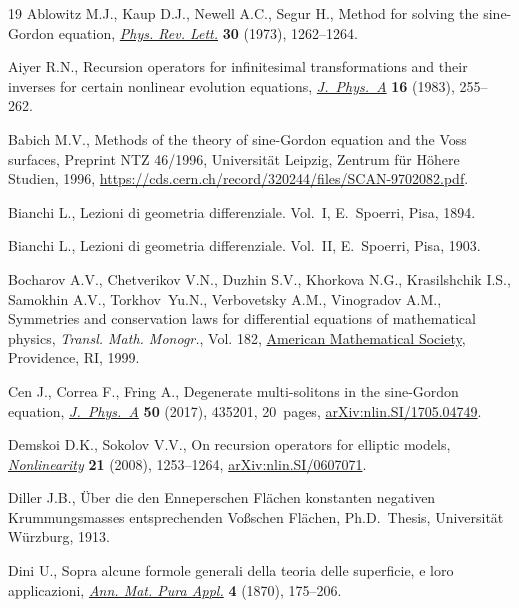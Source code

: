 \documentclass[pdftex]{sigma}
\numberwithin{equation}{section}
\theoremstyle{definition}
\begin{document}
\begin{thebibliography}{19}
\footnotesize\itemsep=0pt
Ablowitz M.J., Kaup D.J., Newell A.C., Segur H., Method for solving the
 sine-{G}ordon equation,
 \href{https://doi.org/10.1103/PhysRevLett.30.1262}{\textit{Phys. Rev. Lett.}}
 \textbf{30} (1973), 1262--1264.

Aiyer R.N., Recursion operators for infinitesimal transformations and their
 inverses for certain nonlinear evolution equations,
 \href{https://doi.org/10.1088/0305-4470/16/2/008}{\textit{J.~Phys.~A}}
 \textbf{16} (1983), 255--262.

Babich M.V., Methods of the theory of sine-{G}ordon equation and the {V}oss
 surfaces, {P}reprint NTZ 46/1996, Universit\"at Leipzig, Zentrum f\"ur
 H\"ohere Studien, 1996,
 \url{https://cds.cern.ch/record/320244/files/SCAN-9702082.pdf}.

Bianchi L., Lezioni di geometria differenziale. {V}ol.~I, E.~Spoerri, Pisa,
 1894.

Bianchi L., Lezioni di geometria differenziale. {V}ol.~II, E.~Spoerri, Pisa,
 1903.

Bocharov A.V., Chetverikov V.N., Duzhin S.V., Khorkova N.G., Krasilshchik I.S.,
 Samokhin A.V., Torkhov~Yu.N., Verbovetsky A.M., Vinogradov A.M., Symmetries
 and conservation laws for differential equations of mathematical physics,
 \textit{Transl. Math. Monogr.}, Vol. 182,
 \href{https://doi.org/10.1090/mmono/182}{American Mathematical Society},
 Providence, RI, 1999.

Cen J., Correa F., Fring A., Degenerate multi-solitons in the sine-{G}ordon
 equation,
 \href{https://doi.org/10.48550/arXiv.1705.04749}{\textit{J.~Phys.~A}}
 \textbf{50} (2017), 435201, 20~pages,
 \href{http://arxiv.org/abs/nlin.SI/1705.04749}{arXiv:nlin.SI/1705.04749}.

Demskoi D.K., Sokolov V.V., On recursion operators for elliptic models,
 \href{https://doi.org/10.48550/arXiv.nlin/0607071}{\textit{Nonlinearity}}
 \textbf{21} (2008), 1253--1264,
 \href{http://arxiv.org/abs/nlin.SI/0607071}{arXiv:nlin.SI/0607071}.

Diller J.B., \"Uber die den {E}nneperschen {F}l\"achen konstanten negativen
 {K}rummungsmasses entsprechenden {V}o{\ss}schen {F}l\"achen, Ph.D.~Thesis,
 {U}niversit\"at W\"urzburg, 1913.

Dini U., Sopra alcune formole generali della teoria delle superficie, e loro
 applicazioni, \href{https://doi.org/10.1007/BF02420031}{\textit{Ann. Mat.
 Pura Appl.}} \textbf{4} (1870), 175--206.


\end{thebibliography}
\end{document}
